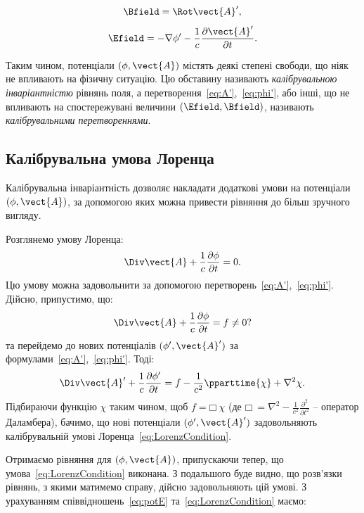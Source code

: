 \begin{equation}
	\Bfield = \Rot \vect{A}',
\end{equation}
\begin{equation}
	\Efield = -\nabla \phi' - \frac{1}{c} \frac{\partial \vect{A}'}{\partial t}.
\end{equation}

Таким чином, потенціали $(\phi, \vect{A})$ містять деякі степені свободи, що ніяк не
впливають на фізичну ситуацію. Цю обставину називають \emph{калібрувальною
інваріантністю} рівнянь поля, а перетворення~\eqref{eq:A'},~\eqref{eq:phi'}, або інші, що не
впливають на спостережувані величини $(\Efield, \Bfield)$, називають \emph{калібрувальними
перетвореннями}.


\subsection*{Калібрувальна умова Лоренца}

Калібрувальна інваріантність дозволяє накладати додаткові умови на
потенціали $(\phi, \vect{A})$, за допомогою яких можна привести рівняння до більш
зручного вигляду.

Розглянемо умову Лоренца:
\begin{equation}\label{eq:LorenzCondition}
	\Div \vect{A} + \frac{1}{c} \frac{\partial \phi}{\partial t} = 0.
\end{equation}
Цю умову можна задовольнити за допомогою перетворень~\eqref{eq:A'},~\eqref{eq:phi'}.
Дійсно, припустимо, що:
\begin{equation*}
	\Div \vect{A} + \frac{1}{c} \frac{\partial \phi}{\partial t} = f \neq 0?
\end{equation*}
та перейдемо до нових потенціалів $(\phi', \vect{A}')$ за формулами~\eqref{eq:A'},~\eqref{eq:phi'}. Тоді:
\begin{equation*}
    \Div \vect{A}' + \frac{1}{c} \frac{\partial \phi'}{\partial t} =
	f - \frac{1}{c^2} \pparttime{\chi} + \nabla^2\chi.
\end{equation*}
Підбираючи функцію $\chi$ таким чином, щоб $f = \mdlgwhtsquare\  \chi$
(де $\mdlgwhtsquare\  = \nabla^2 - \frac{1}{c^2} \frac{\partial^2}{\partial t^2}$ – оператор Даламбера), бачимо, що нові потенціали $(\phi',
	\vect{A}')$
задовольняють калібрувальній умові Лоренца~\eqref{eq:LorenzCondition}.

Отримаємо рівняння для $(\phi, \vect{A})$, припускаючи тепер, що умова~\eqref{eq:LorenzCondition}
виконана. З подальшого буде видно, що розв’язки рівнянь, з якими
матимемо справу, дійсно задовольняють цій умові. З урахуванням
співвідношень~\eqref{eq:potE} та~\eqref{eq:LorenzCondition} маємо:

